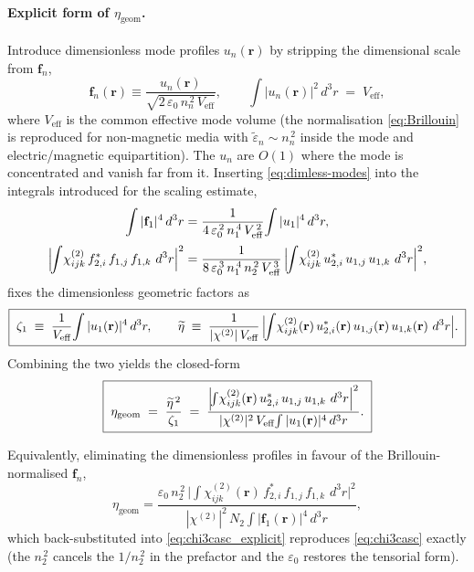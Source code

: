 \documentclass[11pt,a4paper]{article}
\newcommand{\eps}{\varepsilon}
\newcommand{\bvec}[1]{\mathbf{#1}}
\newcommand{\f}{\bvec{f}}
\newcommand{\ri}{\bvec{r}}
\newcommand{\dthreer}{\,d^{3}r}
\newcommand{\chitwo}{\chi^{(2)}}
\begin{document}
\paragraph{Explicit form of $\eta_\text{geom}$.}
Introduce dimensionless mode profiles $u_n(\ri)$ by stripping the
dimensional scale from $\f_n$,
\begin{equation}
  \f_n(\ri)\equiv\frac{u_n(\ri)}{\sqrt{2\,\eps_0\,n_n^{\,2}\,V_\text{eff}}},
  \qquad
  \int|u_n(\ri)|^{2}\dthreer\;=\;V_\text{eff},
  \label{eq:dimless-modes}
\end{equation}
where $V_\text{eff}$ is the common effective mode volume (the
normalisation \eqref{eq:Brillouin} is reproduced for non-magnetic media
with $\widetilde\eps_n\!\sim\!n_n^{\,2}$ inside the mode and electric/magnetic
equipartition). The $u_n$ are $O(1)$ where the mode is concentrated and
vanish far from it. Inserting \eqref{eq:dimless-modes} into the integrals
introduced for the scaling estimate,
\begin{align}
  \int|\f_1|^{4}\dthreer
    &=\frac{1}{4\,\eps_0^{\,2}\,n_1^{\,4}\,V_\text{eff}^{\,2}}\!\int|u_1|^{4}\dthreer,\\[2pt]
  \Bigl|\!\int\!\chitwo_{ijk}\,f_{2,i}^{*}\,f_{1,j}\,f_{1,k}\,\dthreer\Bigr|^{2}
    &=\frac{1}{8\,\eps_0^{\,3}\,n_1^{\,4}\,n_2^{\,2}\,V_\text{eff}^{\,3}}\,
       \Bigl|\!\int\!\chitwo_{ijk}\,u_{2,i}^{*}\,u_{1,j}\,u_{1,k}\,\dthreer\Bigr|^{2},
\end{align}
fixes the dimensionless geometric factors as
\begin{equation}
  \boxed{\;
  \zeta_{1}\;\equiv\;\frac{1}{V_\text{eff}}\!\int|u_{1}(\ri)|^{4}\dthreer,
  \qquad
  \widetilde\eta\;\equiv\;\frac{1}{|\chitwo|\,V_\text{eff}}\,
        \Bigl|\!\int\!\chitwo_{ijk}(\ri)\,u_{2,i}^{*}(\ri)\,u_{1,j}(\ri)\,u_{1,k}(\ri)\,\dthreer\Bigr|.
  \;}
  \label{eq:zeta1-etatilde}
\end{equation}
Combining the two yields the closed-form
\begin{equation}
  \boxed{\;
  \eta_\text{geom}\;=\;\frac{\widetilde\eta^{\,2}}{\zeta_1}
   \;=\;
   \frac{\Bigl|\!\int\!\chitwo_{ijk}(\ri)\,u_{2,i}^{*}\,u_{1,j}\,u_{1,k}\,\dthreer\Bigr|^{2}}
        {|\chitwo|^{2}\,V_\text{eff}\!\int|u_{1}(\ri)|^{4}\dthreer}.
  \;}
  \label{eq:eta-geom-explicit}
\end{equation}

Equivalently, eliminating the dimensionless profiles in favour of the
Brillouin-normalised $\f_n$,
\begin{equation}
  \eta_\text{geom}
   =\frac{\eps_0\,n_2^{\,2}\,
          \bigl|\!\int\!\chitwo_{ijk}(\ri)\,f_{2,i}^{*}\,f_{1,j}\,f_{1,k}\,\dthreer\bigr|^{2}}
         {|\chitwo|^{2}\,N_2\!\int|\f_1(\ri)|^{4}\dthreer},
  \label{eq:eta-geom-f}
\end{equation}
which back-substituted into \eqref{eq:chi3casc_explicit} reproduces
\eqref{eq:chi3casc} exactly (the $n_2^{\,2}$ cancels the $1/n_2^{\,2}$ in the
prefactor and the $\eps_0$ restores the tensorial form).
\end{document}
